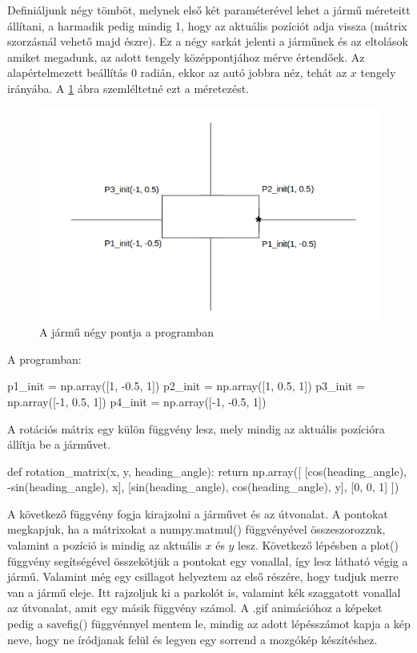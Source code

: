 Definiáljunk négy tömböt, melynek első két paraméterével lehet a jármű méreteitt állítani, a harmadik pedig mindig 1, hogy az aktuális pozíciót adja vissza (mátrix szorzásnál vehető majd észre). Ez a négy sarkát jelenti a járműnek és az eltolások amiket megadunk, az adott tengely középpontjához mérve értendőek. Az alapértelmezett beállítás 0 radián, ekkor az autó jobbra néz, tehát az $ x $ tengely irányába. A \ref{fig:vehicle_points} ábra szemléltetné ezt a méretezést.

\begin{figure}[h!]
\centering
\includegraphics[scale=0.70]{images/vehicle_points.png}
\caption{A jármű négy pontja a programban}
\label{fig:vehicle_points}
\end{figure}

A programban:
\begin{python}
p1_init = np.array([1, -0.5, 1])
p2_init = np.array([1, 0.5, 1])
p3_init = np.array([-1, 0.5, 1])
p4_init = np.array([-1, -0.5, 1])
\end{python}

A rotációs mátrix egy külön függvény lesz, mely mindig az aktuális pozícióra állítja be a járművet.
\begin{python}
def rotation_matrix(x, y, heading_angle):
    return np.array([
        [cos(heading_angle), -sin(heading_angle), x],
        [sin(heading_angle), cos(heading_angle), y],
        [0, 0, 1]
    ])
\end{python}

\bigskip

A következő függvény fogja kirajzolni a járművet és az útvonalat. A pontokat megkapjuk, ha a mátrixokat a numpy.matmul() függvényével összeszorozzuk, valamint a pozíció is mindig az aktuális $ x $ és $ y $ lesz. Következő lépésben a plot() függvény segítségével összekötjük a pontokat egy vonallal, így lesz látható végig a jármű. Valamint még egy csillagot helyeztem az első részére, hogy tudjuk merre van a jármű eleje. Itt rajzoljuk ki a parkolót is, valamint kék szaggatott vonallal az útvonalat, amit egy másik függvény számol. A .gif animációhoz a képeket pedig a savefig() függvénnyel mentem le, mindig az adott lépésszámot kapja a kép neve, hogy ne íródjanak felül és legyen egy sorrend a mozgókép készítéshez.

